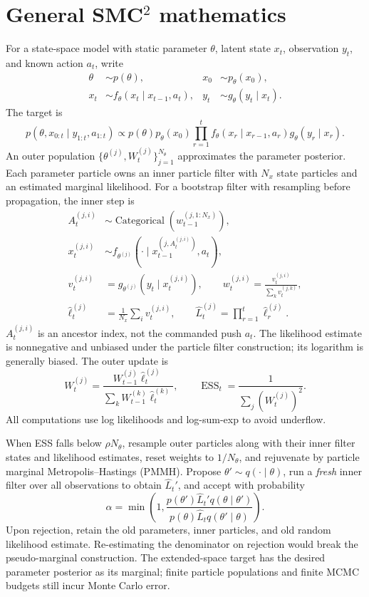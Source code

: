 \documentclass[11pt]{article}
\begin{document}
\section{General \texorpdfstring{SMC$^2$}{SMC2} mathematics}
For a state-space model with static parameter $\theta$, latent state $x_t$,
observation $y_t$, and known action $a_t$, write
\begin{align}
 \theta &\sim p(\theta), & x_0&\sim p_\theta(x_0),\\
 x_t&\sim f_\theta(x_t\mid x_{t-1},a_t), &
 y_t&\sim g_\theta(y_t\mid x_t).
\end{align}
The target is
\begin{equation}
 p(\theta,x_{0:t}\mid y_{1:t},a_{1:t})\propto
 p(\theta)p_\theta(x_0)\prod_{r=1}^t
 f_\theta(x_r\mid x_{r-1},a_r)g_\theta(y_r\mid x_r).
\end{equation}
An outer population $\{\theta^{(j)},W_t^{(j)}\}_{j=1}^{N_\theta}$
approximates the parameter posterior. Each parameter particle owns an
inner particle filter with $N_x$ state particles and an estimated
marginal likelihood. For a bootstrap filter with resampling before
propagation, the inner step is
\begin{align}
 A_t^{(j,i)}&\sim\operatorname{Categorical}(w_{t-1}^{(j,1:N_x)}),\\
 x_t^{(j,i)}&\sim f_{\theta^{(j)}}(\cdot\mid
 x_{t-1}^{(j,A_t^{(j,i)})},a_t),\\
 v_t^{(j,i)}&=g_{\theta^{(j)}}(y_t\mid x_t^{(j,i)}),\qquad
 w_t^{(j,i)}=\frac{v_t^{(j,i)}}{\sum_k v_t^{(j,k)}},\\
 \widehat\ell_t^{(j)}&=\frac{1}{N_x}\sum_i v_t^{(j,i)},\qquad
 \widehat L_t^{(j)}=\prod_{r=1}^t\widehat\ell_r^{(j)}.
\end{align}
$A_t^{(j,i)}$ is an ancestor index, not the commanded push $a_t$.
The likelihood estimate is nonnegative and unbiased under the particle
filter construction; its logarithm is generally biased.
The outer update is
\begin{equation}
 W_t^{(j)}=\frac{W_{t-1}^{(j)}\widehat\ell_t^{(j)}}
 {\sum_k W_{t-1}^{(k)}\widehat\ell_t^{(k)}},\qquad
 \operatorname{ESS}_t=\frac{1}{\sum_j(W_t^{(j)})^2}.
\end{equation}
All computations use log likelihoods and log-sum-exp to avoid underflow.

When ESS falls below $\rho N_\theta$, resample outer particles along with
their inner filter states and likelihood estimates, reset weights to
$1/N_\theta$, and rejuvenate by particle marginal Metropolis--Hastings
(PMMH). Propose $\theta'\sim q(\cdot\mid\theta)$, run a \emph{fresh}
inner filter over all observations to obtain $\widehat L_t'$, and accept
with probability
\begin{equation}
 \alpha=\min\left(1,
 \frac{p(\theta')\widehat L_t' q(\theta\mid\theta')}
 {p(\theta)\widehat L_t q(\theta'\mid\theta)}\right).
\end{equation}
Upon rejection, retain the old parameters, inner particles, and old
random likelihood estimate. Re-estimating the denominator on rejection
would break the pseudo-marginal construction. The extended-space target
has the desired parameter posterior as its marginal; finite particle
populations and finite MCMC budgets still incur Monte Carlo error.
\end{document}
